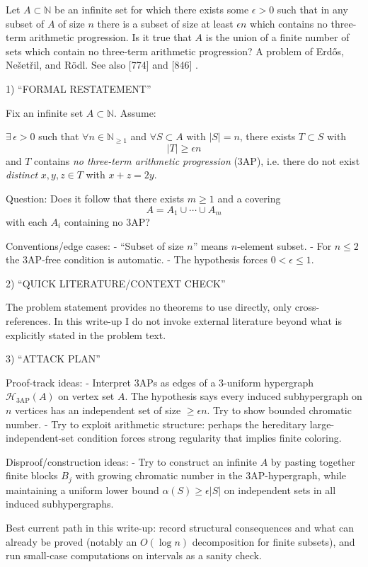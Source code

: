 
Let $A\subset \mathbb{N}$ be an infinite set for which there exists some $\epsilon>0$ such that in any subset of $A$ of size $n$ there is a subset of size at least $\epsilon n$ which contains no three-term arithmetic progression. Is it true that $A$ is the union of a finite number of sets which contain no three-term arithmetic progression? A problem of Erd\H{o}s, Ne\v{s}et\v{r}il, and R\"{o}dl. See also [774] and [846] .

1) “FORMAL RESTATEMENT”

Fix an infinite set $A\subset\mathbb{N}$. Assume:

$\exists\,\epsilon>0$ such that $\forall n\in\mathbb{N}_{\ge 1}$ and $\forall S\subset A$ with $|S|=n$, there exists $T\subset S$ with
\[
|T|\ge \epsilon n
\]
and $T$ contains \emph{no three-term arithmetic progression} (3AP), i.e. there do not exist \emph{distinct} $x,y,z\in T$ with $x+z=2y$.

Question: Does it follow that there exists $m\ge 1$ and a covering
\[
A = A_1\cup\cdots\cup A_m
\]
with each $A_i$ containing no 3AP?

Conventions/edge cases:
- “Subset of size $n$” means $n$-element subset.
- For $n\le 2$ the 3AP-free condition is automatic.
- The hypothesis forces $0<\epsilon\le 1$.

2) “QUICK LITERATURE/CONTEXT CHECK”

The problem statement provides no theorems to use directly, only cross-references. In this write-up I do not invoke external literature beyond what is explicitly stated in the problem text.

3) “ATTACK PLAN”

Proof-track ideas:
- Interpret 3APs as edges of a $3$-uniform hypergraph $\mathcal{H}_{\mathrm{3AP}}(A)$ on vertex set $A$. The hypothesis says every induced subhypergraph on $n$ vertices has an independent set of size $\ge \epsilon n$. Try to show bounded chromatic number.
- Try to exploit arithmetic structure: perhaps the hereditary large-independent-set condition forces strong regularity that implies finite coloring.

Disproof/construction ideas:
- Try to construct an infinite $A$ by pasting together finite blocks $B_j$ with growing chromatic number in the 3AP-hypergraph, while maintaining a uniform lower bound $\alpha(S)\ge \epsilon|S|$ on independent sets in all induced subhypergraphs.

Best current path in this write-up: record structural consequences and what can already be proved (notably an $O(\log n)$ decomposition for finite subsets), and run small-case computations on intervals as a sanity check.

